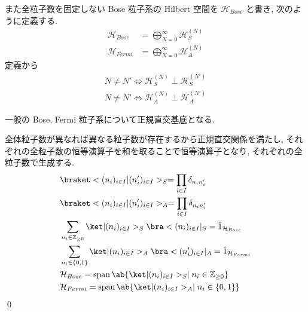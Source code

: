\documentclass[uplatex,dvipdfmx,a4paper,11pt]{jlreq}
\makeatletter
\DeclareMathOperator{\Span}{span}
\newcommand{\ZZ}{\mathbb{Z}}
\newcommand{\HH}{\mathcal{H}}
\numberwithin{equation}{section}
\theoremstyle{definition}
\renewenvironment{proof}[1][\proofname]{\par
  \normalfont
  \topsep6\p@\@plus6\p@ \trivlist
  \item[\hskip\labelsep{\bfseries #1}\@addpunct{\bfseries}]\ignorespaces\quad\par
}{%
  \qed\endtrivlist\@endpefalse
}
\renewcommand\proofname{証明}
\makeatother
\begin{document}
\begin{definition}
  また全粒子数を固定しない Bose 粒子系の Hilbert 空間を $\HH_{Bose}$ と書き, 次のように定義する.
  \begin{align}
    \HH_{Bose}  & = \bigoplus_{N=0}^\infty \HH_S^{(N)}     \\
    \HH_{Fermi} & = \bigoplus_{N = 0}^{\infty} \HH_A^{(N)}
  \end{align}
  定義から
  \begin{align}
    N \neq N' \iff \HH_S^{(N)}\perp\HH_S^{(N')} \\
    N\neq N' \iff \HH_A^{(N)}\perp\HH_A^{(N')}
  \end{align}
\end{definition}
\begin{theorem}
  一般の Bose, Fermi 粒子系について正規直交基底となる.
\end{theorem}
\begin{proof}
  全体粒子数が異なれば異なる粒子数が存在するから正規直交関係を満たし, それぞれの全粒子数の恒等演算子を和を取ることで恒等演算子となり, それぞれの全粒子数で生成する.
  \begin{align}
     & \braket<(n_i)_{i\in I}|(n_i')_{i\in I}>_S = \prod_{i\in I}\delta_{n_in_i'}                   \\
     & \braket<(n_i)_{i\in I}|(n_i')_{i\in I}>_A = \prod_{i\in I}\delta_{n_in_i'}                   \\
     & \sum_{n_i\in\ZZ_{\geq 0}}\ket|(n_i)_{i\in I}>_S\bra<(n_i)_{i\in I}|_S = \hat{1}_{\HH_{Bose}} \\
     & \sum_{n_i\in\{0, 1\}} \ket|(n_i)_{i\in I}>_A\bra<(n_i')_{i\in I}|_A = \hat{1}_{\HH_{Fermi}}  \\
     & \HH_{Bose} = \Span\ab\{\ket|(n_i)_{i\in I}>_S \mid n_i\in\ZZ_{\geq 0} \}                     \\
     & \HH_{Fermi} = \Span\ab\{\ket|(n_i)_{i\in I}>_A \mid n_i\in\{0, 1\} \}
  \end{align}
\end{proof}
\end{document}

